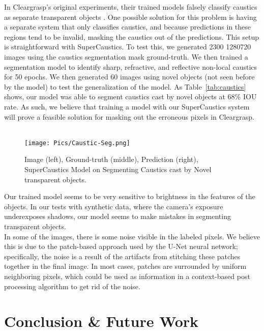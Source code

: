 \documentclass[conference]{IEEEtran}
\begin{document}
 In Cleargrasp's original experiments, their trained models falsely classify caustics as separate transparent objects \cite{cleargrasp}. One possible solution for this problem is having a separate system that only classifies caustics, and because predictions in these regions tend to be invalid, masking the caustics out of the predictions. This setup is straightforward with SuperCaustics. To test this, we generated 2300 1280720 images using the caustics segmentation mask ground-truth. We then trained a segmentation model to identify sharp, refractive, and reflective non-local caustics for 50 epochs. We then generated 60 images using novel objects (not seen before by the model) to test the generalization of the model.  As Table~\ref{tab:caustics} shows, our model was able to segment caustics cast by novel objects at 68\% IOU rate. As such, we believe that training a model with our SuperCaustics system will prove a feasible solution for masking out the erroneous pixels in Cleargrasp.\\ \\

  \begin{figure}
    \center
    \texttt{[image: Pics/Caustic-Seg.png]}
    \caption{Image (left), Ground-truth (middle), Prediction (right),  SuperCaustics Model on Segmenting Caustics cast by Novel transparent objects.}\label{caustic-seg}
  \end{figure}

 Our trained model seems to be very sensitive to brightness in the features of the objects. In our tests with synthetic data, where the camera's exposure underexposes shadows, our model seems to make mistakes in segmenting transparent objects.\\

 In some of the images, there is some noise visible in the labeled pixels. We believe this is due to the patch-based approach used by the U-Net neural network; specifically, the noise is a result of the artifacts from stitching these patches together in the final image. In most cases, patches are surrounded by uniform neighboring pixels, which could be used as information in a context-based post processing algorithm to get rid of the noise.

\section{Conclusion \& Future Work}
\end{document}
